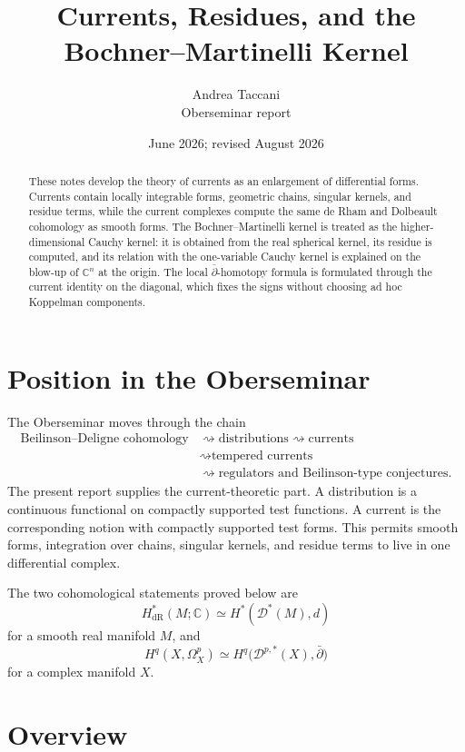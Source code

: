 \documentclass[11pt,a4paper]{article}
\title{Currents, Residues, and the Bochner--Martinelli Kernel}
\author{Andrea Taccani\\[2mm]\small Oberseminar report}
\date{June 2026; revised August 2026}
\theoremstyle{definition}
\theoremstyle{remark}
\newcommand{\C}{\mathbb C}
\newcommand{\Dcur}{\mathcal D}
\newcommand{\ddbar}{\bar\partial}
\begin{document}
\maketitle

\begin{abstract}
These notes develop the theory of currents as an enlargement of differential forms. Currents contain locally integrable forms, geometric chains, singular kernels, and residue terms, while the current complexes compute the same de Rham and Dolbeault cohomology as smooth forms. The Bochner--Martinelli kernel is treated as the higher-dimensional Cauchy kernel: it is obtained from the real spherical kernel, its residue is computed, and its relation with the one-variable Cauchy kernel is explained on the blow-up of $\C^n$ at the origin. The local $\bar\partial$-homotopy formula is formulated through the current identity on the diagonal, which fixes the signs without choosing ad hoc Koppelman components.
\end{abstract}

\tableofcontents

\section{Position in the Oberseminar}

The Oberseminar moves through the chain
\[
\begin{aligned}
\text{Beilinson--Deligne cohomology}
&\rightsquigarrow \text{distributions}
\rightsquigarrow \text{currents}\\
&\rightsquigarrow \text{tempered currents}\\
&\rightsquigarrow \text{regulators and Beilinson-type conjectures}.
\end{aligned}
\]
The present report supplies the current-theoretic part. A distribution is a continuous functional on compactly supported test functions. A current is the corresponding notion with compactly supported test forms. This permits smooth forms, integration over chains, singular kernels, and residue terms to live in one differential complex.

The two cohomological statements proved below are
\[
H^*_{\mathrm{dR}}(M;\C)\simeq H^*(\Dcur^*(M),d)
\]
for a smooth real manifold $M$, and
\[
H^q(X,\Omega_X^p)\simeq H^q\bigl(\Dcur^{p,*}(X),\ddbar\bigr)
\]
for a complex manifold $X$.

\section{Overview}
\end{document}
